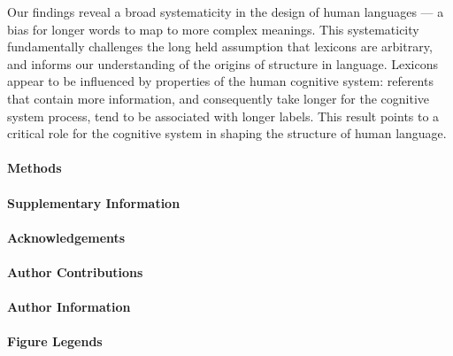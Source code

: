 \documentclass[12pt]{article}
\renewcommand\refname{References and Notes}
\begin{document}
Our findings reveal a broad systematicity in the design of human languages  --- a bias for longer words to map to more complex meanings.  This systematicity fundamentally  challenges the long held assumption that lexicons are arbitrary, and informs our understanding of the origins of structure in language. Lexicons appear to be influenced by properties of the human cognitive system: referents that contain more information, and consequently take longer for the cognitive system process, tend to be associated with longer labels. This result points to a critical  role for the cognitive system in shaping the structure of human language. 

\paragraph*{Methods}

\renewcommand{\refname}{\normalsize References}



\paragraph*{Supplementary Information}

\paragraph*{Acknowledgements}

\paragraph*{Author Contributions}

\paragraph*{Author Information}

\paragraph*{Figure Legends}~ \\
\end{document}
